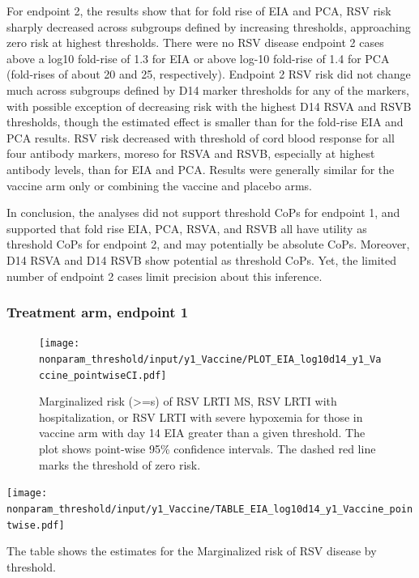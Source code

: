 \documentclass[11pt]{article}
\begin{document}
For endpoint 2, the results show that for fold rise of EIA and PCA, RSV risk sharply decreased across subgroups defined by increasing thresholds, approaching zero risk at highest thresholds. There were no RSV disease endpoint 2 cases above a log10 fold-rise of 1.3 for EIA or above log-10 fold-rise of 1.4 for PCA (fold-rises of about 20 and 25, respectively). Endpoint 2 RSV risk did not change much across subgroups defined by D14 marker thresholds for any of the markers, with possible exception of decreasing risk with the highest D14 RSVA and RSVB thresholds, though the estimated effect is smaller than for the fold-rise EIA and PCA results. RSV risk decreased with threshold of cord blood response for all four antibody markers, moreso for RSVA and RSVB, especially at highest antibody levels, than for EIA and PCA. Results were generally similar for the vaccine arm only or combining the vaccine and placebo arms.

In conclusion, the analyses did not support threshold CoPs for endpoint 1, and supported that fold rise EIA, PCA, RSVA, and RSVB all have utility as threshold CoPs for endpoint 2, and may potentially be absolute CoPs. Moreover, D14 RSVA and D14 RSVB show potential as threshold CoPs. Yet, the limited number of endpoint 2 cases limit precision about this inference.

\hypertarget{treatment-arm-endpoint-1}{%
\subsubsection{Treatment arm, endpoint 1}\label{treatment-arm-endpoint-1}}

\begin{figure}[H]
    \centering
    \texttt{[image: nonparam\_threshold/input/y1\_Vaccine/PLOT\_EIA\_log10d14\_y1\_Vaccine\_pointwiseCI.pdf]}
   \caption{Marginalized risk (>=s) of RSV LRTI MS, RSV LRTI with hospitalization, or RSV LRTI with severe hypoxemia for those in vaccine arm with day 14 EIA greater than a given threshold. The plot shows point-wise 95\% confidence intervals. The dashed red line marks the threshold of zero risk.}
      \label{fig:PLOT_EIA_log10d14_y1_Vaccine_pointwiseCI}
\end{figure}

\begin{table}[H]
    \centering
    \texttt{[image: nonparam\_threshold/input/y1\_Vaccine/TABLE\_EIA\_log10d14\_y1\_Vaccine\_pointwise.pdf]}
    \caption{The table shows the estimates for the Marginalized risk of RSV disease by threshold. }
\end{table}
\end{document}
